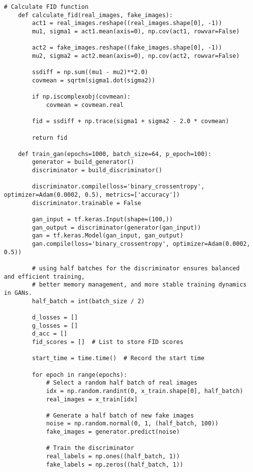 \begin{lstlisting}[style=mypython, caption=GAN model with Convolutional layers]
    # Calculate FID function
    def calculate_fid(real_images, fake_images):
        act1 = real_images.reshape((real_images.shape[0], -1))
        mu1, sigma1 = act1.mean(axis=0), np.cov(act1, rowvar=False)
        
        act2 = fake_images.reshape((fake_images.shape[0], -1))
        mu2, sigma2 = act2.mean(axis=0), np.cov(act2, rowvar=False)
        
        ssdiff = np.sum((mu1 - mu2)**2.0)
        covmean = sqrtm(sigma1.dot(sigma2))
        
        if np.iscomplexobj(covmean):
            covmean = covmean.real
        
        fid = ssdiff + np.trace(sigma1 + sigma2 - 2.0 * covmean)
        
        return fid
    
    def train_gan(epochs=1000, batch_size=64, p_epoch=100):
        generator = build_generator()
        discriminator = build_discriminator()
    
        discriminator.compile(loss='binary_crossentropy', optimizer=Adam(0.0002, 0.5), metrics=['accuracy'])
        discriminator.trainable = False
    
        gan_input = tf.keras.Input(shape=(100,))
        gan_output = discriminator(generator(gan_input))
        gan = tf.keras.Model(gan_input, gan_output)
        gan.compile(loss='binary_crossentropy', optimizer=Adam(0.0002, 0.5))
    
        # using half batches for the discriminator ensures balanced and efficient training, 
        # better memory management, and more stable training dynamics in GANs.
        half_batch = int(batch_size / 2)
        
        d_losses = []
        g_losses = []
        d_acc = []
        fid_scores = []  # List to store FID scores
        
        start_time = time.time()  # Record the start time
    
        for epoch in range(epochs):
            # Select a random half batch of real images
            idx = np.random.randint(0, x_train.shape[0], half_batch)
            real_images = x_train[idx]
    
            # Generate a half batch of new fake images
            noise = np.random.normal(0, 1, (half_batch, 100))
            fake_images = generator.predict(noise)
    
            # Train the discriminator
            real_labels = np.ones((half_batch, 1))
            fake_labels = np.zeros((half_batch, 1))
    

\end{lstlisting}
